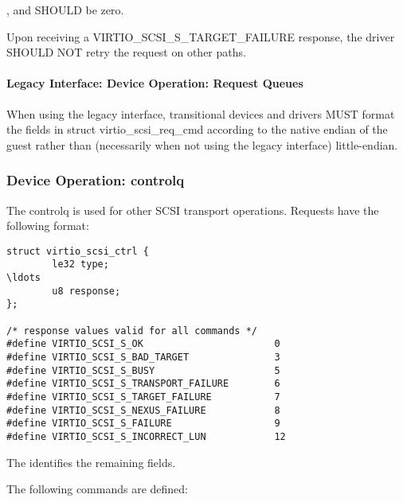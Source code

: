 
,  and  SHOULD be zero.

Upon receiving a VIRTIO_SCSI_S_TARGET_FAILURE response, the driver
SHOULD NOT retry the request on other paths.

\paragraph{Legacy Interface: Device Operation: Request Queues}\label{sec:Device Types / SCSI Host Device / Device Operation / Device Operation: Request Queues / Legacy Interface: Device Operation: Request Queues}
When using the legacy interface, transitional devices and drivers
MUST format the fields in struct virtio_scsi_req_cmd
according to the native endian of the guest rather than
(necessarily when not using the legacy interface) little-endian.

\subsubsection{Device Operation: controlq}\label{sec:Device Types / SCSI Host Device / Device Operation / Device Operation: controlq}

The controlq is used for other SCSI transport operations.
Requests have the following format:

\begin{lstlisting}
struct virtio_scsi_ctrl {
        le32 type;
\ldots
        u8 response;
};

/* response values valid for all commands */
#define VIRTIO_SCSI_S_OK                       0
#define VIRTIO_SCSI_S_BAD_TARGET               3
#define VIRTIO_SCSI_S_BUSY                     5
#define VIRTIO_SCSI_S_TRANSPORT_FAILURE        6
#define VIRTIO_SCSI_S_TARGET_FAILURE           7
#define VIRTIO_SCSI_S_NEXUS_FAILURE            8
#define VIRTIO_SCSI_S_FAILURE                  9
#define VIRTIO_SCSI_S_INCORRECT_LUN            12
\end{lstlisting}

The  identifies the remaining fields.

The following commands are defined:

